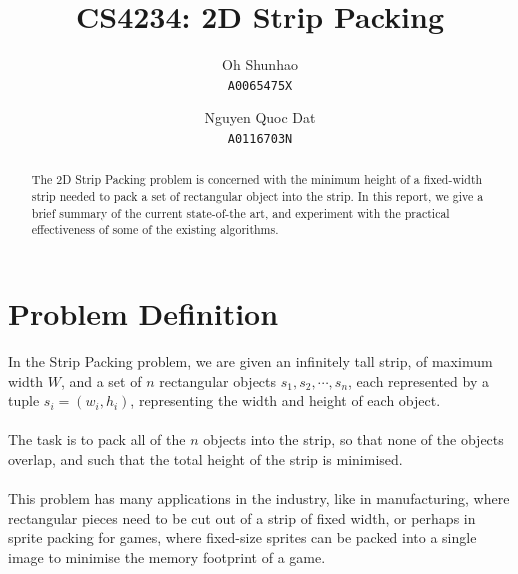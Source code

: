 \documentclass{article}
\begin{document}
\theoremstyle{plain}
\newtheorem{thm}{Theorem}
\newtheorem{lem}[thm]{Lemma}
\newtheorem{prop}[thm]{Proposition}
\newtheorem{corr}{Corollary}
\theoremstyle{definition}
\newtheorem{defn}{Definition}
\newtheorem{conj}{Conjecture}
\newtheorem{exmp}{Example}
\theoremstyle{remark}
\newtheorem*{rem}{Remark}
\newtheorem*{note}{Note}
\newtheorem{case}{Case}

\author{
Oh Shunhao\\
  \texttt{A0065475X}
  \and
Nguyen Quoc Dat\\
  \texttt{A0116703N}
}
\title{CS4234: 2D Strip Packing}
\date{}

\maketitle

\begin{abstract}
\begin{center}
The 2D Strip Packing problem is concerned with the minimum height of a fixed-width strip needed to pack a set of rectangular object into the strip. In this report, we give a brief summary of the current state-of-the art, and experiment with the practical effectiveness of some of the existing algorithms.
\end{center}
\end{abstract}

\section{Problem Definition}
In the Strip Packing problem, we are given an infinitely tall strip, of maximum width $W$, and a set of $n$ rectangular objects $s_1,s_2,\cdots,s_n$, each represented by a tuple $s_i = (w_i,h_i)$, representing the width and height of each object.\\
\\
The task is to pack all of the $n$ objects into the strip, so that none of the objects overlap, and such that the total height of the strip is minimised.\\
\\
This problem has many applications in the industry, like in manufacturing, where rectangular pieces need to be cut out of a strip of fixed width, or perhaps in sprite packing for games, where fixed-size sprites can be packed into a single image to minimise the memory footprint of a game.\\
\end{document}
